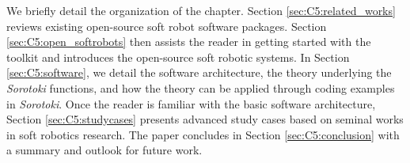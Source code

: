 We briefly detail the organization of the chapter. Section \ref{sec:C5:related_works} reviews existing open-source soft robot software packages. Section \ref{sec:C5:open_softrobots} then assists the reader in getting started with the toolkit and introduces the open-source soft robotic systems. In Section \ref{sec:C5:software}, we detail the software architecture, the theory underlying the \textit{Sorotoki} functions, and how the theory can be applied through coding examples in \textit{Sorotoki}. Once the reader is familiar with the basic software architecture, Section \ref{sec:C5:studycases} presents advanced study cases based on seminal works in soft robotics research. The paper concludes in Section \ref{sec:C5:conclusion} with a summary and outlook for future work.
